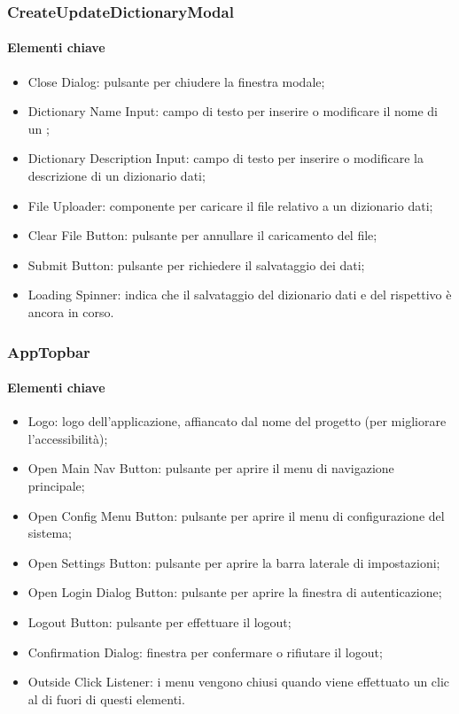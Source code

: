 \subsubsection{CreateUpdateDictionaryModal}

\paragraph*{Elementi chiave}
\begin{itemize}
  \item Close Dialog: pulsante per chiudere la finestra modale;
  \item Dictionary Name Input: campo di testo per inserire o modificare il nome di un ;
  \item Dictionary Description Input: campo di testo per inserire o modificare la descrizione di un dizionario dati;
  \item File Uploader: componente per caricare il file relativo a un dizionario dati;
  \item Clear File Button: pulsante per annullare il caricamento del file;
  \item Submit Button: pulsante per richiedere il salvataggio dei dati;
  \item Loading Spinner: indica che il salvataggio del dizionario dati e del rispettivo  è ancora in corso.
\end{itemize}

\subsubsection{AppTopbar}

\paragraph*{Elementi chiave}
\begin{itemize}
  \item Logo: logo dell'applicazione, affiancato dal nome del progetto (per migliorare l'accessibilità);
  \item Open Main Nav Button: pulsante per aprire il menu di navigazione principale;
  \item Open Config Menu Button: pulsante per aprire il menu di configurazione del sistema;
  \item Open Settings Button: pulsante per aprire la barra laterale di impostazioni;
  \item Open Login Dialog Button: pulsante per aprire la finestra di autenticazione;
  \item Logout Button: pulsante per effettuare il logout;
  \item Confirmation Dialog: finestra per confermare o rifiutare il logout;
  \item Outside Click Listener: i menu vengono chiusi quando viene effettuato un clic al di fuori di questi elementi.
\end{itemize}

